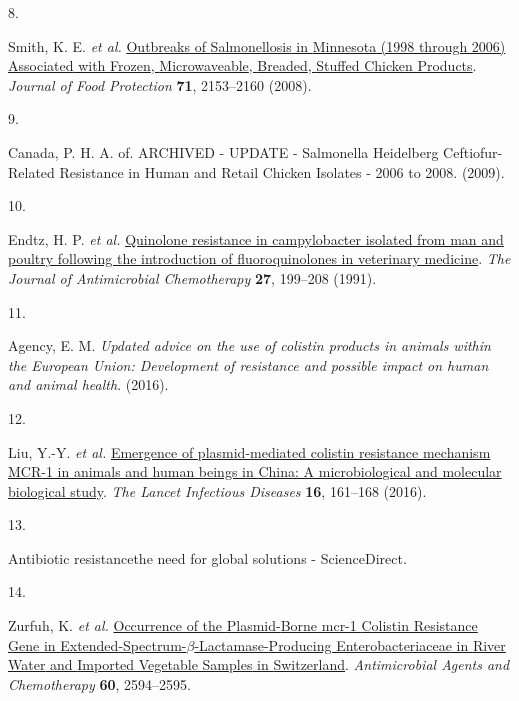 \documentclass[
]{book}
\newlength{\cslhangindent}
\newlength{\csllabelwidth}
\newlength{\cslentryspacingunit} %
\newenvironment{CSLReferences}[2] %
 {%
  \setlength{\parindent}{0pt}
  \ifodd #1
  \let\oldpar\par
  \def\par{\hangindent=\cslhangindent\oldpar}
  \fi
  \setlength{\parskip}{#2\cslentryspacingunit}
 }%
 {}
\newcommand{\CSLLeftMargin}[1]{\parbox[t]{\csllabelwidth}{#1}}
\newcommand{\CSLRightInline}[1]{\parbox[t]{\linewidth - \csllabelwidth}{#1}\break}
\begin{document}
\begin{CSLReferences}{0}{0}
\leavevmode{}%
\CSLLeftMargin{8. }
\CSLRightInline{Smith, K. E. \emph{et al.} \href{https://doi.org/10.4315/0362-028X-71.10.2153}{Outbreaks of {Salmonellosis} in {Minnesota} (1998 through 2006) {Associated} with {Frozen}, {Microwaveable}, {Breaded}, {Stuffed Chicken Products}}. \emph{Journal of Food Protection} \textbf{71}, 2153--2160 (2008).}

\leavevmode{}%
\CSLLeftMargin{9. }
\CSLRightInline{Canada, P. H. A. of. {ARCHIVED} - {UPDATE} - {Salmonella Heidelberg Ceftiofur}-{Related Resistance} in {Human} and {Retail Chicken Isolates} - 2006 to 2008. (2009).}

\leavevmode{}%
\CSLLeftMargin{10. }
\CSLRightInline{Endtz, H. P. \emph{et al.} \href{https://doi.org/10.1093/jac/27.2.199}{Quinolone resistance in campylobacter isolated from man and poultry following the introduction of fluoroquinolones in veterinary medicine}. \emph{The Journal of Antimicrobial Chemotherapy} \textbf{27}, 199--208 (1991).}

\leavevmode{}%
\CSLLeftMargin{11. }
\CSLRightInline{Agency, E. M. \emph{Updated advice on the use of colistin products in animals within the {European Union}: Development of resistance and possible impact on human and animal health}. (2016).}

\leavevmode{}%
\CSLLeftMargin{12. }
\CSLRightInline{Liu, Y.-Y. \emph{et al.} \href{https://doi.org/10.1016/S1473-3099(15)00424-7}{Emergence of plasmid-mediated colistin resistance mechanism {MCR}-1 in animals and human beings in {China}: A microbiological and molecular biological study}. \emph{The Lancet Infectious Diseases} \textbf{16}, 161--168 (2016).}

\leavevmode{}%
\CSLLeftMargin{13. }
\CSLRightInline{Antibiotic resistance\textemdash the need for global solutions - {ScienceDirect}.}

\leavevmode{}%
\CSLLeftMargin{14. }
\CSLRightInline{Zurfuh, K. \emph{et al.} \href{https://doi.org/10.1128/AAC.00066-16}{Occurrence of the {Plasmid}-{Borne} mcr-1 {Colistin Resistance Gene} in {Extended}-{Spectrum}-{\(\beta\)}-{Lactamase}-{Producing Enterobacteriaceae} in {River Water} and {Imported Vegetable Samples} in {Switzerland}}. \emph{Antimicrobial Agents and Chemotherapy} \textbf{60}, 2594--2595.}


\end{CSLReferences}
\end{document}
